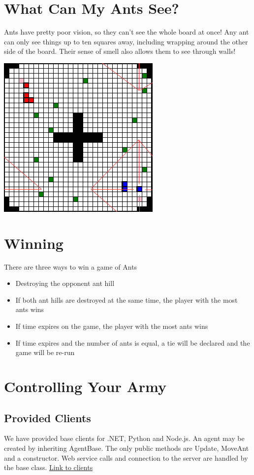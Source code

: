 \documentclass{article}
\begin{document}
\newpage

\section{What Can My Ants See?}
Ants have pretty poor vision, so they can't see the whole board at once! Any ant can only see things up to ten squares away, including wrapping around the other side of the board. Their sense of smell also allows them to see through walls!

\begin{center}
\includegraphics[scale=0.5]{fieldOfVision.png}
\end{center}

\section{Winning}
There are three ways to win a game of Ants
\begin{itemize}
  \item Destroying the opponent ant hill
  \item If both ant hills are destroyed at the same time, the player with the most ants wins
  \item If time expires on the game, the player with the most ants wins
  \item If time expires and the number of ants is equal, a tie will be declared and the game will be re-run
\end{itemize}

\section{Controlling Your Army}
\subsection{Provided Clients}
We have provided base clients for .NET, Python and Node.js. An agent may be created by inheriting AgentBase. The only public methods are Update, MoveAnt and a constructor. Web service calls and connection to the server are handled by the base class.
\newline
\newline
\href{https://github.com/eonarheim/AntAICompetition}{Link to clients}
\end{document}
